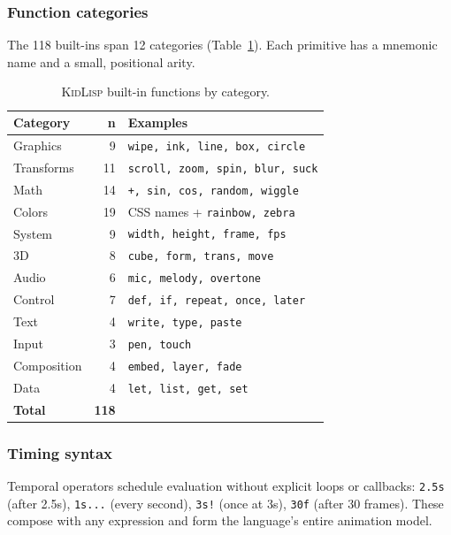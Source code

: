 \documentclass[letterpaper]{article}
\begin{document}
\subsubsection{Function categories}

The 118 built-ins span 12 categories (Table~\ref{tab:functions}). Each primitive has a mnemonic name and a small, positional arity.

\begin{table}[h]
\small
\centering
\begin{tabularx}{\columnwidth}{lrX}
\toprule
\textbf{Category} & \textbf{n} & \textbf{Examples} \\
\midrule
Graphics    & 9  & \texttt{wipe, ink, line, box, circle} \\
Transforms  & 11 & \texttt{scroll, zoom, spin, blur, suck} \\
Math        & 14 & \texttt{+, sin, cos, random, wiggle} \\
Colors      & 19 & CSS names + \texttt{rainbow, zebra} \\
System      & 9  & \texttt{width, height, frame, fps} \\
3D          & 8  & \texttt{cube, form, trans, move} \\
Audio       & 6  & \texttt{mic, melody, overtone} \\
Control     & 7  & \texttt{def, if, repeat, once, later} \\
Text        & 4  & \texttt{write, type, paste} \\
Input       & 3  & \texttt{pen, touch} \\
Composition & 4  & \texttt{embed, layer, fade} \\
Data        & 4  & \texttt{let, list, get, set} \\
\midrule
\textbf{Total} & \textbf{118} & \\
\bottomrule
\end{tabularx}
\caption{\textsc{KidLisp} built-in functions by category.}
\label{tab:functions}
\end{table}

\subsubsection{Timing syntax}
Temporal operators schedule evaluation without explicit loops or callbacks:
\texttt{2.5s} (after 2.5s), \texttt{1s...} (every second), \texttt{3s!} (once at 3s), \texttt{30f} (after 30 frames). These compose with any expression and form the language's entire animation model.
\end{document}
